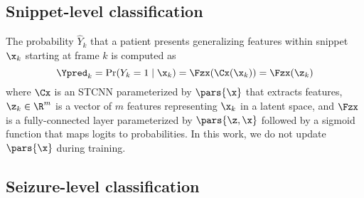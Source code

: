 \subsection{Snippet-level classification}
\label{sec:snippet-level}





The probability $\hat{Y}_k$ that a patient presents generalizing features within snippet $\x_k$ starting at frame $k$ is computed as
\begin{equation}
    \Ypred_k = \Pr(Y_k = 1 \mid \x_k) = \Fzx( \Cx(\x_k) ) = \Fzx( \z_k)
\end{equation}
where
$\Cx$ is an \ac{STCNN} parameterized by $\pars{\x}$ that extracts features,
$\z_k \in \R ^ m$ is a vector of $m$ features representing $\x_k$ in a latent space,
and
$\Fzx$ is a fully-connected layer parameterized by $\pars{\z,\x}$ followed by a sigmoid function that maps logits to probabilities.
In this work, we do not update $\pars{\x}$ during training.

\subsection{Seizure-level classification}
\label{sec:meth_seizure}

